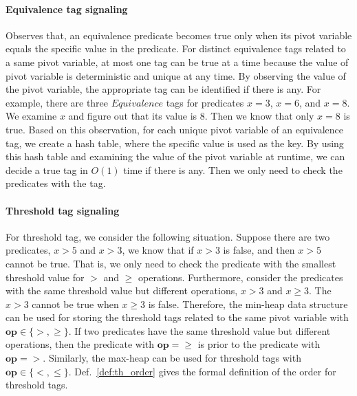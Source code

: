 \documentclass[preprint]{sigplanconf}
\begin{document}
\paragraph{Equivalence tag signaling}
Observes that, an equivalence predicate becomes true only when its pivot 
variable equals the specific value in the predicate. For distinct equivalence 
tags related to a same pivot variable, at most one tag can be true at a time 
because the value of pivot variable is deterministic and unique at any time. By 
observing the value of the pivot variable, the appropriate tag can be 
identified if there is any. For example, there are three $Equivalence$ tags for
predicates $x = 3$, $x = 6$, and $x = 8$. We examine $x$ and figure out that
its value is $8$. Then we know that only $x = 8$ is true. Based on this 
observation, for each unique pivot variable of an equivalence tag, we create a 
hash table, where the specific value is used as the key. By using this hash 
table and examining the value of the pivot variable at runtime, we can decide a
true tag in $O(1)$ time if there is any. Then we only need to check the 
predicates with the tag. 


\paragraph{Threshold tag signaling}
For threshold tag, we consider the following situation. Suppose there are two 
predicates, $x > 5$ and $x > 3$, we know that if $x > 3$ is false, and then 
$x > 5$ cannot be true. That is, we only need to check the predicate with the 
smallest threshold value for $>$ and $\ge$ operations. Furthermore, consider the predicates
with the same threshold value but different operations, $x > 3$ and $x \ge 3$.
The $x > 3$ cannot be true when $x \ge 3$ is false. Therefore, the min-heap 
data structure can be used for storing the threshold tags related to the same 
pivot variable with $\boldsymbol{op} \in \{>, \ge\}$. If two predicates have 
the same threshold value but different operations, then the predicate with 
$\boldsymbol{op}=\ge$ is prior to the predicate with $\boldsymbol{op}=>$.
Similarly, the max-heap can be used for threshold tags with $\boldsymbol{op}
\in \{<, \le\}$. Def.~\ref{def:th_order} gives the formal definition of the 
order for threshold tags. 
\end{document}
